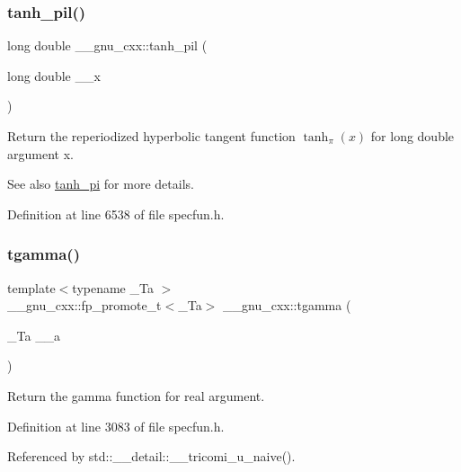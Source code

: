 \subsubsection{\texorpdfstring{tanh\+\_\+pil()}{tanh\_pil()}}
{\footnotesize\ttfamily long double \+\_\+\+\_\+gnu\+\_\+cxx\+::tanh\+\_\+pil (\begin{DoxyParamCaption}\item[{long double}]{\+\_\+\+\_\+x }\end{DoxyParamCaption})\hspace{0.3cm}{\ttfamily [inline]}}

Return the reperiodized hyperbolic tangent function $ \tanh_\pi(x) $ for {\ttfamily long double} argument {\ttfamily x}.

\begin{DoxySeeAlso}{See also}
\hyperlink{group__mathsf__gnu_ga8729ffd5acf3266315e9dac1b5a9b3a6}{tanh\+\_\+pi} for more details. 
\end{DoxySeeAlso}


Definition at line 6538 of file specfun.\+h.

\mbox{\label{group__mathsf__gnu_ga73a634663e4eceb1e6bcf3fc16773b7b}} 
\subsubsection{\texorpdfstring{tgamma()}{tgamma()}\hspace{0.1cm}{\footnotesize\ttfamily [1/3]}}
{\footnotesize\ttfamily template$<$typename \+\_\+\+Ta $>$ \\
\+\_\+\+\_\+gnu\+\_\+cxx\+::fp\+\_\+promote\+\_\+t$<$\+\_\+\+Ta$>$ \+\_\+\+\_\+gnu\+\_\+cxx\+::tgamma (\begin{DoxyParamCaption}\item[{\+\_\+\+Ta}]{\+\_\+\+\_\+a }\end{DoxyParamCaption})\hspace{0.3cm}{\ttfamily [inline]}}

Return the gamma function for real argument. 

Definition at line 3083 of file specfun.\+h.



Referenced by std\+::\+\_\+\+\_\+detail\+::\+\_\+\+\_\+tricomi\+\_\+u\+\_\+naive().

